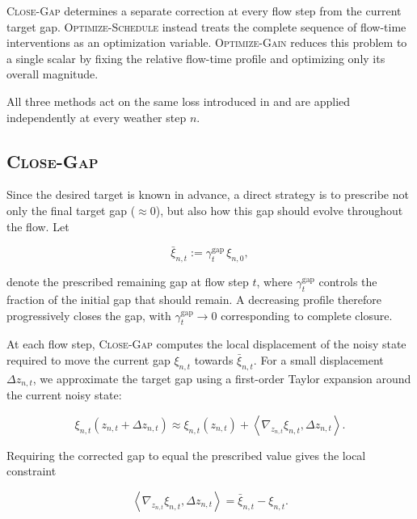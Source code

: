 \textsc{Close-Gap} determines a separate correction at every flow step from
the current target gap. \textsc{Optimize-Schedule} instead treats the complete
sequence of flow-time interventions as an optimization variable.
\textsc{Optimize-Gain} reduces this problem to a single scalar by fixing the
relative flow-time profile and optimizing only its overall magnitude.

All three methods act on the same loss introduced in
 and are applied independently at every weather step
\(n\).


\subsection{\textsc{Close-Gap}}
\label{sec:close-gap}

Since the desired target is known in advance, a direct strategy is to prescribe
not only the final target gap ($\approx0$), but also how this gap should evolve throughout
the flow. Let

\begin{equation}
    \bar{\xi}_{n,t}
    :=
    \gamma_t^{\mathrm{gap}}\,\xi_{n,0},
    \label{eq:close-gap-path}
\end{equation}

denote the prescribed remaining gap at flow step $t$, where
$\gamma_t^{\mathrm{gap}}$ controls the fraction of the initial gap that should
remain. A decreasing profile therefore progressively closes the gap, with
$\gamma_t^{\mathrm{gap}}\rightarrow 0$ corresponding to complete closure.

At each flow step, \textsc{Close-Gap} computes the local displacement of the
noisy state required to move the current gap $\xi_{n,t}$ towards
$\bar{\xi}_{n,t}$. For a small displacement $\Delta z_{n,t}$, we approximate the target gap
using a first-order Taylor expansion around the current noisy state:

\begin{equation}
    \xi_{n,t}(z_{n,t}+\Delta z_{n,t})
    \approx
    \xi_{n,t}(z_{n,t})
    +
    \left\langle
        \nabla_{z_{n,t}}\xi_{n,t},
        \Delta z_{n,t}
    \right\rangle.
\end{equation}

Requiring the corrected gap to equal the prescribed value gives the local
constraint

\begin{equation}
    \left\langle
        \nabla_{z_{n,t}}\xi_{n,t},
        \Delta z_{n,t}
    \right\rangle
    =
    \bar{\xi}_{n,t}-\xi_{n,t}.
    \label{eq:close-gap-constraint}
\end{equation}

